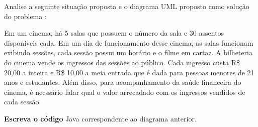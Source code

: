 \documentclass{lib/eng_softdoc}
\begin{document}
\problem Analise a seguinte situação proposta e o diagrama UML proposto como solução do problema :
		
		Em um cinema, há 5 salas que possuem o número da sala e 30 assentos disponíveis cada. 
    Em um dia de funcionamento desse cinema, as salas funcionam exibindo sessões, cada sessão possui um horário e o filme em cartaz.
    A bilheteria do cinema vende os ingressos das sessões ao público.
    Cada ingresso custa R\$ 20,00 a inteira e R\$ 10,00 a meia entrada que é dada para pessoas menores de 21 anos e
    estudantes. Além disso, para acompanhamento da saúde financeira do cinema, é necssário falar qual o valor arrecadado com os ingressos vendidos
    de cada sessão.

\vspace{0.5cm}

\vspace{0.5cm}
		\textbf{Escreva o código} Java correspondente ao diagrama anterior.
\end{document}
